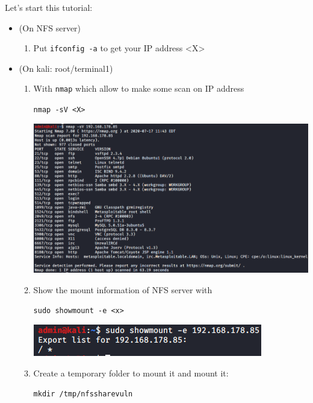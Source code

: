 \documentclass{article}
\begin{document}
\noindent Let's start this tutorial:
\begin{itemize}
    \item (On NFS server) 
    \begin{enumerate}
        \item Put \lstinline{ifconfig -a} to get your IP address <X>
    \end{enumerate}
    \item (On kali: root/terminal1) 
    \begin{enumerate}
        \item With \lstinline{nmap} which allow to make some scan on IP address
        \begin{center}
            \lstinline{nmap -sV <X>}
        \end{center}
        \begin{center}
            \includegraphics[scale=0.6]{image/1-nmap.PNG}
        \end{center}
        \item Show the mount information of NFS server with
        \begin{center}
            \lstinline{sudo showmount -e <x>}
        \end{center}
        \begin{center}
            \includegraphics[scale=0.6]{image/2-showmount.PNG}
        \end{center}
        \item Create a temporary folder to mount it and mount it:
        \begin{center}
            \lstinline{mkdir /tmp/nfssharevuln}\\

\end{center}
\end{enumerate}
\end{itemize}
\end{document}
